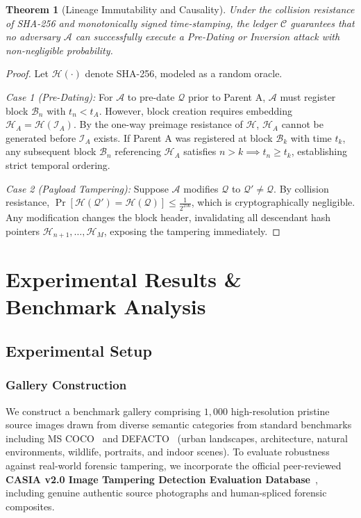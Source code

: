 \documentclass[journal]{IEEEtran}
\newtheorem{theorem}{Theorem}
\begin{document}
\begin{theorem}[Lineage Immutability and Causality]
Under the collision resistance of SHA-256 and monotonically signed time-stamping, the ledger $\mathcal{C}$ guarantees that no adversary $\mathcal{A}$ can successfully execute a Pre-Dating or Inversion attack with non-negligible probability.
\end{theorem}

\begin{proof}
Let $\mathcal{H}(\cdot)$ denote SHA-256, modeled as a random oracle. 

\textit{Case 1 (Pre-Dating):} For $\mathcal{A}$ to pre-date $\mathcal{Q}$ prior to Parent A, $\mathcal{A}$ must register block $\mathcal{B}_n$ with $t_n < t_A$. However, block creation requires embedding $\mathcal{H}_A = \mathcal{H}(\mathcal{I}_A)$. By the one-way preimage resistance of $\mathcal{H}$, $\mathcal{H}_A$ cannot be generated before $\mathcal{I}_A$ exists. If Parent A was registered at block $\mathcal{B}_k$ with time $t_k$, any subsequent block $\mathcal{B}_n$ referencing $\mathcal{H}_A$ satisfies $n > k \implies t_n \ge t_k$, establishing strict temporal ordering.

\textit{Case 2 (Payload Tampering):} Suppose $\mathcal{A}$ modifies $\mathcal{Q}$ to $\mathcal{Q}' \neq \mathcal{Q}$. By collision resistance, $\Pr[\mathcal{H}(\mathcal{Q}') = \mathcal{H}(\mathcal{Q})] \le \frac{1}{2^{256}}$, which is cryptographically negligible. Any modification changes the block header, invalidating all descendant hash pointers $\mathcal{H}_{n+1}, \dots, \mathcal{H}_M$, exposing the tampering immediately.
\end{proof}

\section{Experimental Results \& Benchmark Analysis}

\subsection{Experimental Setup}
\subsubsection{Gallery Construction}
We construct a benchmark gallery comprising $1,000$ high-resolution pristine source images drawn from diverse semantic categories from standard benchmarks including MS COCO~\cite{Lin2014COCO} and DEFACTO~\cite{Mahfoudi2019DEFACTO} (urban landscapes, architecture, natural environments, wildlife, portraits, and indoor scenes). To evaluate robustness against real-world forensic tampering, we incorporate the official peer-reviewed \textbf{CASIA v2.0 Image Tampering Detection Evaluation Database}~\cite{Dong2013CASIA}, including genuine authentic source photographs and human-spliced forensic composites.
\end{document}
